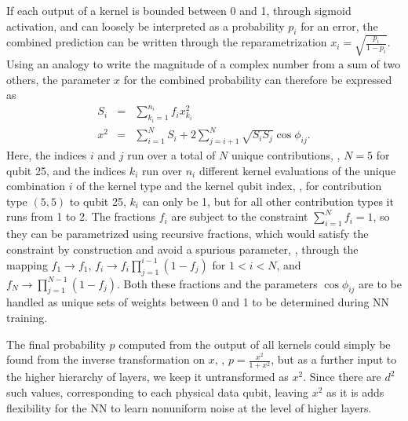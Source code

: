 If each output of a kernel is bounded between 0 and 1, through sigmoid activation, and can loosely be interpreted as a probability $p_i$ for an error, the combined prediction can be written through the reparametrization $x_i=\sqrt{\frac{p_i}{1-p_i}}$. Using an analogy to write the magnitude of a complex number from a sum of two others, the parameter $x$ for the combined probability can therefore be expressed as
\begin{eqnarray}
S_i &=& \sum_{k_i=1}^{n_i} f_i x^2_{k_i} \\
x^2 &=& \sum_{i=1}^{N} S_i + 2 \sum_{j=i+1}^{N} \sqrt{S_i S_j} \cos{\phi_{ij}}.
\label{eq:kernsum}
\end{eqnarray}
Here, the indices $i$ and $j$ run over a total of $N$ unique contributions, \eg, $N=5$ for qubit 25, and the indices $k_i$ run over $n_i$ different kernel evaluations of the unique combination $i$ of the kernel type and the kernel qubit index, \eg, for contribution type $(5,5)$ to qubit 25, $k_i$ can only be 1, but for all other contribution types it runs from 1 to 2.
The fractions $f_i$ are subject to the constraint $\sum_{i=1}^{N} f_i = 1$, so they can be parametrized using recursive fractions, which would satisfy the constraint by construction and avoid a spurious parameter, \ie, through the mapping $f_1 \to f_1$, $f_i \to f_i\prod_{j=1}^{i-1}\left(1-f_j\right)$ for $1<i<N$, and $f_N \to \prod_{j=1}^{N-1}\left(1-f_j\right)$. Both these fractions and the parameters $\cos{\phi_{ij}}$ are to be handled as unique sets of weights between 0 and 1 to be determined during NN training.

The final probability $p$ computed from the output of all kernels could simply be found from the inverse transformation on $x$, \ie, $p=\frac{x^2}{1+x^2}$, but as a further input to the higher hierarchy of layers, we keep it untransformed as $x^2$. Since there are $d^2$ such values, corresponding to each physical data qubit, leaving $x^2$ as it is adds flexibility for the NN to learn nonuniform noise at the level of higher layers.



